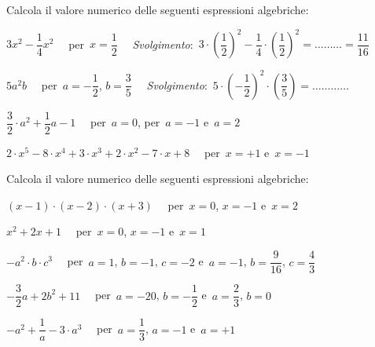 \begin{esercizio}
\label{ese:8.20}
Calcola il valore numerico delle seguenti espressioni algebriche:
 \begin{enumeratea}
\spazielenx
 \item $3x^{2}-\dfrac{1}{4}x^{2}\quad$ per~$x=\dfrac{1}{2}\quad$ 
\emph{Svolgimento}:~$3\cdot \left(\dfrac{1}{2}\right)^{2}-\dfrac{1}{4}\cdot 
\left(\dfrac{1}{2}\right)^{2}=\ldots \ldots \ldots =\dfrac{11}{16}$
 \item $5a^{2}b\quad$ per~$a=-{\dfrac{1}{2}}$, $b=\dfrac{3}{5}\quad$ 
\emph{Svolgimento}:~$5\cdot \left(-{\dfrac{1}{2}}\right)^{2}\cdot 
\left(\dfrac{3}{5}\right)=\ldots \ldots \ldots \ldots $
 \item $\dfrac{3}{2}\cdot a^{2}+\dfrac{1}{2}a-1\quad$ per~$a=0$, per~$a=-1$ 
e~$a=2$
 \item $2\cdot x^{5}-8\cdot x^{4}+3\cdot x^{3}+2\cdot x^{2}-7\cdot x+8\quad$ 
per~$x=+1$ e~$x=-1$
 \end{enumeratea}
\end{esercizio}

\begin{esercizio}
\label{ese:8.21}
Calcola il valore numerico delle seguenti espressioni algebriche:
 \begin{enumeratea}
\spazielenx
 \item $(x-1)\cdot (x-2)\cdot (x+3)\quad$ per~$x=0$, $x= -1$ e~$x= 2$
 \item $x^{2}+2x+1\quad$ per~$x=0$, $x= -1$ e~$x= 1$
 \item $-a^{2}\cdot b\cdot c^{3}\quad$ per~$a=1$, $b=-1$, $c=-2$ e~$a=-1$, 
$b=\dfrac{9}{16}$, $c=\dfrac{4}{3}$
 \item $-{\dfrac{3}{2}}a+2b^{2}+11\quad$ per~$a=-20$, $b=-{\dfrac{1}{2}}$ 
e~$a=\dfrac{2}{3}$, $b=0$
 \item $-a^{2}+\dfrac{1}{a}-3\cdot a^{3}\quad$ per~$a=\dfrac{1}{3}$, $a=-1$ 
e~$a=+1$
 \end{enumeratea}
\end{esercizio}


